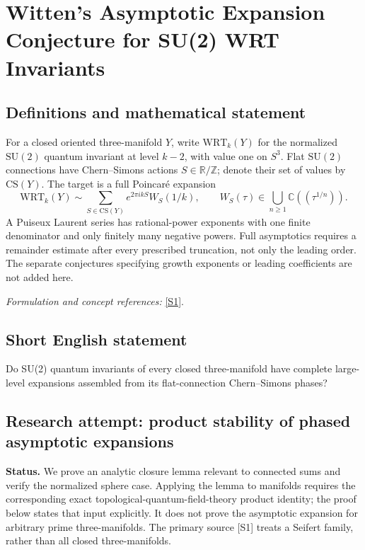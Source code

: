 \documentclass[11pt]{article}
\begin{document}
\section*{\texorpdfstring{Witten's Asymptotic Expansion Conjecture for SU(2) WRT Invariants}{Witten's Asymptotic Expansion Conjecture for SU(2) WRT Invariants}}\label{statement}
\subsection{Definitions and mathematical statement}
For a closed oriented three-manifold $Y$, write $\mathrm{WRT}_k(Y)$ for the normalized $\mathrm{SU}(2)$ quantum invariant at level $k-2$, with value one on $S^3$. Flat $\mathrm{SU}(2)$ connections have Chern--Simons actions $S\in{\mathbb{R}}/{\mathbb{Z}}$; denote their set of values by $\mathrm{CS}(Y)$. The target is a full Poincar\'e expansion
\[
 \mathrm{WRT}_k(Y)\sim\sum_{S\in\mathrm{CS}(Y)}e^{2\pi i kS}W_S(1/k),
 \qquad W_S(\tau)\in\bigcup_{n\ge1}{\mathbb{C}}((\tau^{1/n})).
\]
A Puiseux Laurent series has rational-power exponents with one finite denominator and only finitely many negative powers. Full asymptotics requires a remainder estimate after every prescribed truncation, not only the leading order. The separate conjectures specifying growth exponents or leading coefficients are not added here.
\par\smallskip\textit{Formulation and concept references:} \href{https://arxiv.org/html/2510.10678v1}{[S1]}.

\subsection{Short English statement}
Do SU(2) quantum invariants of every closed three-manifold have complete large-level expansions assembled from its flat-connection Chern–Simons phases?
\subsection{Research attempt: product stability of phased asymptotic expansions}
\textbf{Status.} We prove an analytic closure lemma relevant to connected sums and verify the normalized sphere case. Applying the lemma to manifolds requires the corresponding exact topological-quantum-field-theory product identity; the proof below states that input explicitly. It does not prove the asymptotic expansion for arbitrary prime three-manifolds. The primary source [S1] treats a Seifert family, rather than all closed three-manifolds.
\end{document}
